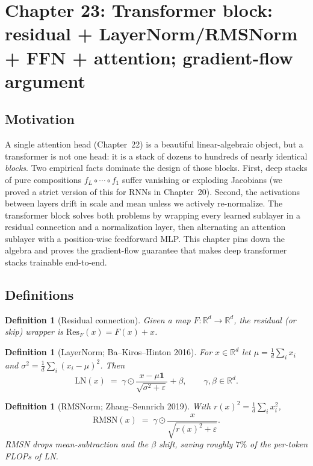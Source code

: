\documentclass[11pt]{article}
\newtheorem{definition}[theorem]{Definition}
\theoremstyle{remark}
\begin{document}
\section*{Chapter 23: Transformer block: residual + LayerNorm/RMSNorm + FFN + attention; gradient-flow argument}

\subsection*{Motivation}

A single attention head (Chapter~22) is a beautiful linear-algebraic object, but a transformer is not one head: it is a stack of dozens to hundreds of nearly identical \emph{blocks}. Two empirical facts dominate the design of those blocks. First, deep stacks of pure compositions $f_L \circ \cdots \circ f_1$ suffer vanishing or exploding Jacobians (we proved a strict version of this for RNNs in Chapter~20). Second, the activations between layers drift in scale and mean unless we actively re-normalize. The transformer block solves both problems by wrapping every learned sublayer in a residual connection and a normalization layer, then alternating an attention sublayer with a position-wise feedforward MLP. This chapter pins down the algebra and proves the gradient-flow guarantee that makes deep transformer stacks trainable end-to-end.

\subsection*{Definitions}

\begin{definition}[Residual connection]
Given a map $F : \mathbb{R}^d \to \mathbb{R}^d$, the \emph{residual} (or \emph{skip}) wrapper is $\mathrm{Res}_F(x) = F(x) + x$.
\end{definition}

\begin{definition}[LayerNorm; Ba--Kiros--Hinton 2016]
For $x \in \mathbb{R}^d$ let $\mu = \tfrac1d \sum_i x_i$ and $\sigma^2 = \tfrac1d \sum_i (x_i - \mu)^2$. Then
\[
  \mathrm{LN}(x) \;=\; \gamma \odot \frac{x - \mu \mathbf{1}}{\sqrt{\sigma^2 + \varepsilon}} + \beta,
  \qquad \gamma, \beta \in \mathbb{R}^d.
\]
\end{definition}

\begin{definition}[RMSNorm; Zhang--Sennrich 2019]
With $r(x)^2 = \tfrac1d \sum_i x_i^2$,
\[
  \mathrm{RMSN}(x) \;=\; \gamma \odot \frac{x}{\sqrt{r(x)^2 + \varepsilon}}.
\]
RMSN drops mean-subtraction and the $\beta$ shift, saving roughly $7\%$ of the per-token FLOPs of LN.
\end{definition}
\end{document}
